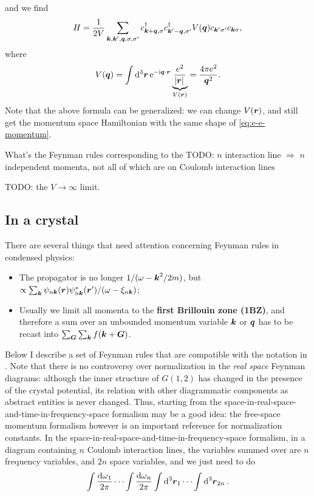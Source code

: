 \documentclass[hyperref, a4paper, 12pt]{report}
\newcommand*{\ii}{\mathrm{i}}
\newcommand*{\ee}{\mathrm{e}}
\newcommand*{\concept}[1]{{\textbf{#1}}}
\begin{document}
and we find 
\begin{equation}
    H = \frac{1}{2V} \sum_{\vb*{k}, \vb*{k}', \vb*{q}, \sigma, \sigma'}
    c^\dagger_{\vb*{k} + \vb*{q}, \sigma} c^\dagger_{\vb*{k}' - \vb*{q}, \sigma'}
    V(\vb*{q}) c_{\vb*{k}' \sigma'} c_{\vb*{k} \sigma}, 
    \label{eq:e-e-momentum}
\end{equation}
where 
\begin{equation}
    V(\vb*{q}) = \int \dd[3]{\vb*{r}} \ee^{- \ii \vb*{q} \cdot \vb*{r}} \underbrace{\frac{e^2}{\abs*{\vb*{r}}}}_{V(\vb*{r})} = \frac{4\pi e^2}{\vb*{q}^2}.
\end{equation}
Note that the above formula can be generalized: 
we can change $V(\vb*{r})$, 
and still get the momentum space Hamiltonian with the same shape of \eqref{eq:e-e-momentum}.

What's the Feynman rules corresponding to the 
TODO: $n$ interaction line $\Rightarrow$ $n$ independent momenta,
not all of which are on Coulomb interaction lines

TODO: the $V \to \infty$ limit.

\subsection{In a crystal}\label{sec:crystal}

There are several things that need attention concerning Feynman rules in condensed physics:
\begin{itemize}
    \item The propagator is no longer $1 / (\omega - \vb*{k}^2 / 2m)$, but 
    $\propto \sum_{\vb*{k}} \psi_{n \vb*{k}}(\vb*{r}) \psi^*_{n \vb*{k}} (\vb*{r}') / (\omega - \xi_{n \vb*{k}})$;
    \item Usually we limit all momenta to the \concept{first Brillouin zone (1BZ)}, 
    and therefore a sum over an unbounded momentum variable $\vb*{k}$ or $\vb*{q}$
    has to be recast into $\sum_{\vb*{G}} \sum_{\vb*{k}} f(\vb*{k} + \vb*{G})$.
\end{itemize}

Below I describe a set of Feynman rules that are compatible with the notation in \cite{hybertsen1986electron}.
Note that there is no controversy over 
normalization in the \emph{real space} Feynman diagrams:
although the inner structure of $G(1, 2)$ has changed in the presence of the crystal potential, 
its relation with other diagrammatic components as abstract entities 
is never changed.
Thus, starting from the space-in-real-space-and-time-in-frequency-space formalism may be a good idea:
the free-space momentum formalism 
however is an important reference for normalization constants.
In the space-in-real-space-and-time-in-frequency-space formalism,
in a diagram containing $n$ Coulomb interaction lines,
the variables summed over are $n$ frequency variables,
and $2n$ space variables,
and we just need to do 
\begin{equation}
    \int \frac{\dd{\omega}_1}{2\pi} \cdots \int \frac{\dd{\omega}_n}{2\pi} 
    \int \dd[3]{\vb*{r}_1} \cdots \int \dd[3]{\vb*{r}_{2n}}.
\end{equation}
\end{document}
